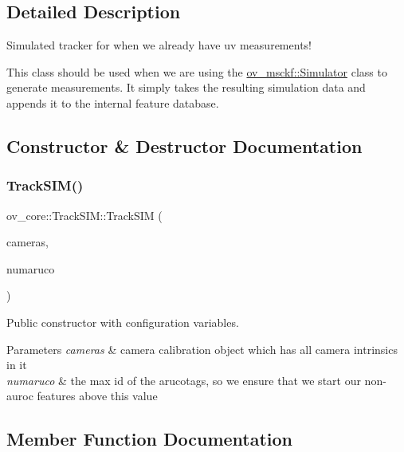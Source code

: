 \subsection{Detailed Description}
Simulated tracker for when we already have uv measurements! 

This class should be used when we are using the \hyperlink{classov__msckf_1_1Simulator}{ov\+\_\+msckf\+::\+Simulator} class to generate measurements. It simply takes the resulting simulation data and appends it to the internal feature database. 

\subsection{Constructor \& Destructor Documentation}
\mbox{\label{classov__core_1_1TrackSIM_ac1b011188c7ec1af805b66bd5eaa29c8}} 
\subsubsection{\texorpdfstring{Track\+S\+I\+M()}{TrackSIM()}}
{\footnotesize\ttfamily ov\+\_\+core\+::\+Track\+S\+I\+M\+::\+Track\+S\+IM (\begin{DoxyParamCaption}\item[{std\+::unordered\+\_\+map$<$ size\+\_\+t, std\+::shared\+\_\+ptr$<$ \hyperlink{classov__core_1_1CamBase}{Cam\+Base} $>$$>$}]{cameras,  }\item[{int}]{numaruco }\end{DoxyParamCaption})\hspace{0.3cm}{\ttfamily [inline]}}



Public constructor with configuration variables. 


\begin{DoxyParams}{Parameters}
{\em cameras} & camera calibration object which has all camera intrinsics in it \\
\hline
{\em numaruco} & the max id of the arucotags, so we ensure that we start our non-\/auroc features above this value \\
\hline
\end{DoxyParams}


\subsection{Member Function Documentation}
\mbox{\label{classov__core_1_1TrackSIM_a00388c410c804854c4c91e1a392d44e0}} 
